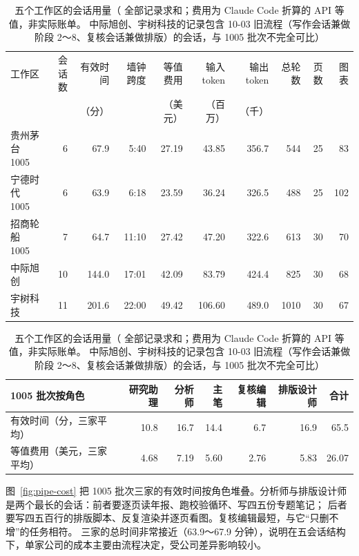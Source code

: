 \begin{table}[t]
\centering\scriptsize
\caption{五个工作区的会话用量（ 全部记录求和；费用为 Claude Code 折算的 API 等值，非实际账单。
中际旭创、宇树科技的记录包含 10-03 旧流程（写作会话兼做阶段 2～8、复核会话兼做排版）的会话，与 1005 批次不完全可比）}
\label{tab:pipe-usage}
\setlength{\tabcolsep}{3.5pt}
\begin{tabular}{@{}lrrrrrrrrr@{}}
\toprule
工作区 & 会话数 & 有效时间 & 墙钟跨度 & 等值费用 & 输入 token & 输出 token & 总轮数 & 页数 & 图表 \\
 & & （分） & & （美元） & （百万） & （千） & & & \\
\midrule
贵州茅台 1005 & 6 & 67.9 & 5:40 & 27.19 & 43.85 & 356.7 & 544 & 25 & 83 \\
宁德时代 1005 & 6 & 63.9 & 6:18 & 23.59 & 36.24 & 326.5 & 488 & 25 & 102 \\
招商轮船 1005 & 7 & 64.7 & 11:10 & 27.42 & 47.20 & 322.6 & 613 & 30 & 70 \\
中际旭创 & 10 & 144.0 & 17:01 & 42.09 & 83.79 & 424.4 & 825 & 30 & 68 \\
宇树科技 & 11 & 201.6 & 22:00 & 49.42 & 106.60 & 489.0 & 1010 & 30 & 67 \\
\bottomrule
\end{tabular}

\vspace{6pt}
\begin{tabular}{@{}lrrrrrr@{}}
\toprule
1005 批次按角色 & 研究助理 & 分析师 & 主笔 & 复核编辑 & 排版设计师 & 合计 \\
\midrule
有效时间（分，三家平均） & 10.8 & 16.7 & 14.4 & 6.7 & 16.9 & 65.5 \\
等值费用（美元，三家平均） & 4.68 & 7.19 & 5.60 & 2.76 & 5.83 & 26.07 \\
\bottomrule
\end{tabular}
\end{table}

图~\ref{fig:pipe-cost} 把 1005 批次三家的有效时间按角色堆叠。分析师与排版设计师是两个最长的会话：前者要逐页读年报、跑校验循环、写四五份专题笔记；
后者要写四五百行的排版脚本、反复渲染并逐页看图。复核编辑最短，与它“只删不增”的任务相符。
三家的总时间非常接近（63.9～67.9 分钟），说明在五会话结构下，单家公司的成本主要由流程决定，受公司差异影响较小。

